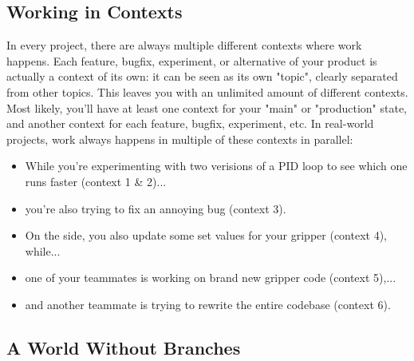 \documentclass{article}
\begin{document}
\subsection{Working in Contexts}
In every project, there are always multiple different contexts where work happens. Each feature, bugfix, experiment, or alternative of your product is actually a context of its own: it can be seen as its own "topic", clearly separated from other topics.
\newline\newline
This leaves you with an unlimited amount of different contexts. Most likely, you'll have at least one context for your "main" or "production" state, and another context for each feature, bugfix, experiment, etc.
\newline\newline
In real-world projects, work always happens in multiple of these contexts in parallel:
\begin{itemize}
    \item While you're experimenting with two verisions of a PID loop to see which one runs faster (context 1 \& 2)...
    \item you're also trying to fix an annoying bug (context 3).
    \item On the side, you also update some set values for your gripper (context 4), while...
    \item one of your teammates is working on brand new gripper code (context 5),...
    \item and another teammate is trying to rewrite the entire codebase (context 6).
\end{itemize}

\subsection{A World Without Branches}
\end{document}
